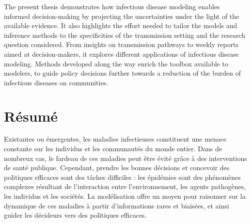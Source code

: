 The present thesis demonstrates how infectious disease modeling enables informed decision-making by projecting the uncertainties under the light of the available evidence. It also highlights the effort needed to tailor the models and inference methods to the specificities of the transmission setting and the research question considered. From insights on transmission pathways to weekly reports aimed at decision-makers, it explores different applications of infectious disease modeling. Methods developed along the way enrich the toolbox available to modelers, to guide policy decisions further towards a reduction of the burden of infectious diseases on communities.

 \vspace{-.5cm}
 \chapter*{Résumé} 
\vspace{-.5cm}
Existantes ou émergentes, les maladies infectieuses constituent une menace constante sur les individus et les communautés du monde entier. Dans de nombreux cas, le fardeau de ces maladies peut être évité grâce à des interventions de santé publique. Cependant, prendre les bonnes décisions et concevoir des politiques efficaces sont des tâches difficiles : les épidémies sont des phénomènes complexes résultant de l'interaction entre l'environnement, les agents pathogènes, les individus et les sociétés. La modélisation offre un moyen pour raisonner sur la dynamique de ces maladies à partir d'informations rares et biaisées, et ainsi guider les décideurs vers des politiques efficaces. 


